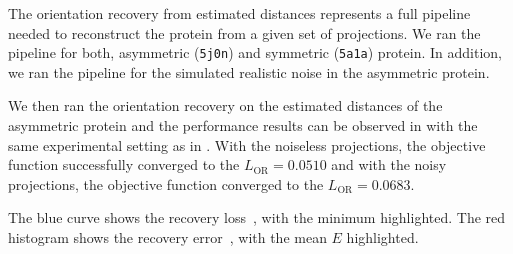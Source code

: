 The orientation recovery from estimated distances represents a full pipeline needed to reconstruct the protein from a given set of projections.
We ran the pipeline for both, asymmetric (\texttt{5j0n}) and symmetric (\texttt{5a1a}) protein.
In addition, we ran the pipeline for the simulated realistic noise in the asymmetric protein.

We then ran the orientation recovery on the estimated distances of the asymmetric protein and the performance results can be observed in  with the same experimental setting as in .
With the noiseless projections, the objective function successfully converged to the $L_\text{OR} = 0.0510$ and with the noisy projections, the objective function converged to the $L_\text{OR} = 0.0683$.

The blue curve shows the recovery loss~, with the minimum highlighted.
The red histogram shows the recovery error~, with the mean $E$ highlighted.

